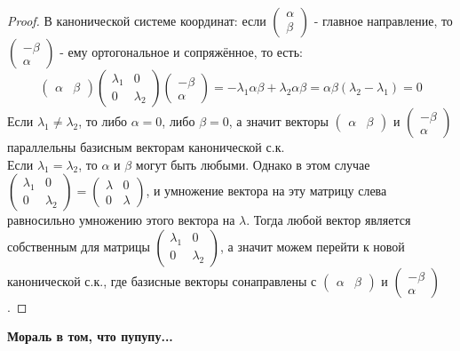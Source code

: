\documentclass[a4paper, 12pt]{article}
\theoremstyle{definition}
\begin{document}
	\begin{proof}
		В канонической системе координат: если $\begin{pmatrix} \alpha \\ \beta \end{pmatrix}$ - главное направление, то $\begin{pmatrix} -\beta \\ \alpha \end{pmatrix}$ - ему ортогональное и сопряжённое, то есть: $$\begin{pmatrix} \alpha & \beta \end{pmatrix}\begin{pmatrix} \lambda_1&0 \\ 0&\lambda_2 \end{pmatrix}\begin{pmatrix} -\beta \\ \alpha \end{pmatrix} = -\lambda_1\alpha\beta + \lambda_2\alpha\beta = \alpha\beta(\lambda_2-\lambda_1) = 0$$
	Если $\lambda_1 \neq \lambda_2$, то либо $\alpha = 0$, либо $\beta = 0$, а значит векторы $\begin{pmatrix} \alpha & \beta \end{pmatrix}$ и $\begin{pmatrix} -\beta \\ \alpha \end{pmatrix}$ параллельны базисным векторам канонической с.к.\\
	Если $\lambda_1 = \lambda_2$, то $\alpha$ и $\beta$ могут быть любыми. Однако в этом случае $\begin{pmatrix} \lambda_1&0 \\ 0&\lambda_2 \end{pmatrix} = \begin{pmatrix} \lambda&0 \\ 0&\lambda \end{pmatrix}$, и умножение вектора на эту матрицу слева равносильно умножению этого вектора на $\lambda$. Тогда любой вектор является собственным для матрицы $\begin{pmatrix} \lambda_1&0 \\ 0&\lambda_2 \end{pmatrix}$, а значит можем перейти к новой канонической с.к., где базисные векторы сонаправлены с $\begin{pmatrix} \alpha & \beta \end{pmatrix}$ и $\begin{pmatrix} -\beta \\ \alpha \end{pmatrix}$.
	\end{proof}
	\bfseries Мораль в том, что пупупу...\mdseries
\end{document}
